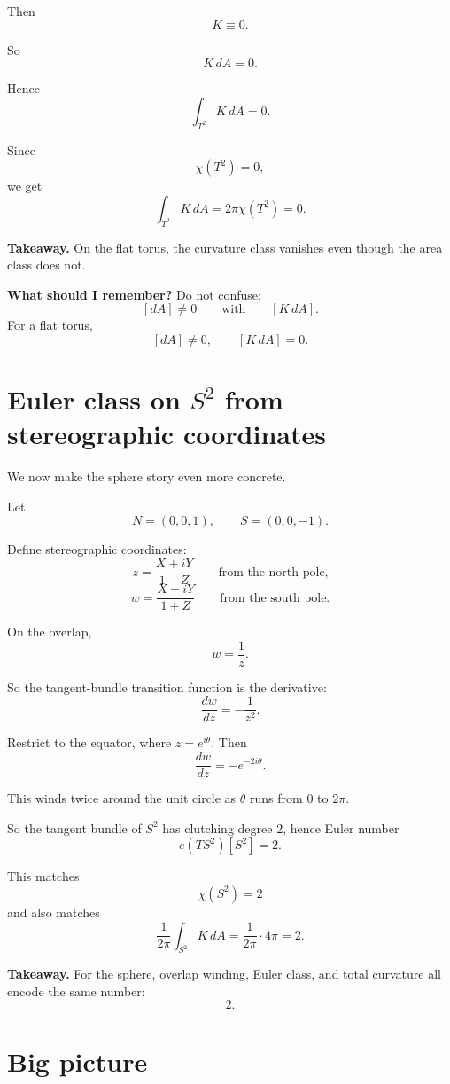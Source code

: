 \documentclass[11pt]{article}
\newenvironment{takeaway}
{\begin{framed}\noindent\textbf{Takeaway. }}
{\end{framed}}
\newenvironment{remember}
{\begin{framed}\noindent\textbf{What should I remember? }}
{\end{framed}}
\begin{document}
Then
\[
K\equiv 0.
\]

So
\[
K\,dA=0.
\]

Hence
\[
\int_{T^2}K\,dA=0.
\]

Since
\[
\chi(T^2)=0,
\]
we get
\[
\int_{T^2}K\,dA=2\pi\chi(T^2)=0.
\]

\begin{takeaway}
On the flat torus, the curvature class vanishes even though the area class does not.
\end{takeaway}

\begin{remember}
Do not confuse:
\[
[dA]\neq 0
\qquad\text{with}\qquad
[K\,dA].
\]
For a flat torus,
\[
[dA]\neq 0,\qquad [K\,dA]=0.
\]
\end{remember}

\section{Euler class on \(S^2\) from stereographic coordinates}

We now make the sphere story even more concrete.

Let
\[
N=(0,0,1),\qquad S=(0,0,-1).
\]

Define stereographic coordinates:
\[
z=\frac{X+iY}{1-Z}
\qquad\text{from the north pole,}
\]
\[
w=\frac{X-iY}{1+Z}
\qquad\text{from the south pole.}
\]

On the overlap,
\[
w=\frac{1}{z}.
\]

So the tangent-bundle transition function is the derivative:
\[
\frac{dw}{dz}=-\frac{1}{z^2}.
\]

Restrict to the equator, where \(z=e^{i\theta}\). Then
\[
\frac{dw}{dz}=-e^{-2i\theta}.
\]

This winds twice around the unit circle as \(\theta\) runs from \(0\) to \(2\pi\).

So the tangent bundle of \(S^2\) has clutching degree \(2\), hence Euler number
\[
e(TS^2)[S^2]=2.
\]

This matches
\[
\chi(S^2)=2
\]
and also matches
\[
\frac{1}{2\pi}\int_{S^2}K\,dA
=
\frac{1}{2\pi}\cdot 4\pi
=
2.
\]

\begin{takeaway}
For the sphere, overlap winding, Euler class, and total curvature all encode the same number:
\[
2.
\]
\end{takeaway}

\section{Big picture}
\end{document}
